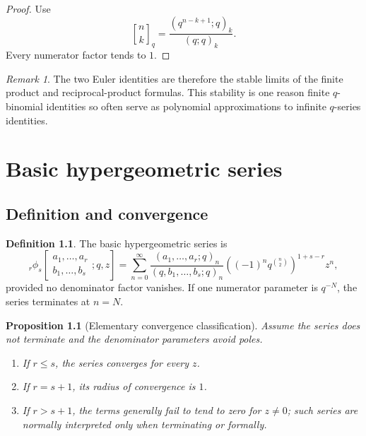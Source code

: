 \documentclass[11pt,oneside,openany]{book}
\newtheorem{proposition}[proposition]{Proposition}
\theoremstyle{definition}
\newtheorem{definition}[definition]{Definition}
\theoremstyle{remark}
\newtheorem{remark}[remark]{Remark}
\newcommand{\qbinom}[2]{\genfrac{[}{]}{0pt}{}{#1}{#2}_{q}}
\begin{document}
\begin{proof}
Use
\[
 \qbinom nk=\frac{(q^{n-k+1};q)_k}{(q;q)_k}.
\]
Every numerator factor tends to $1$.
\end{proof}

\begin{remark}
The two Euler identities are therefore the stable limits of the finite product and reciprocal-product formulas.  This stability is one reason finite $q$-binomial identities so often serve as polynomial approximations to infinite $q$-series identities.
\end{remark}

\chapter{Basic hypergeometric series}\label{chap:basic-hypergeometric}

\section{Definition and convergence}

\begin{definition}
The basic hypergeometric series is
\[
 {}_r\phi_s\!\left[
 \begin{matrix}a_1,\dots,a_r\\ b_1,\dots,b_s\end{matrix};q,z\right]
 =\sum_{n=0}^{\infty}
 \frac{(a_1,\dots,a_r;q)_n}{(q,b_1,\dots,b_s;q)_n}
 \left((-1)^nq^{\binom n2}\right)^{1+s-r}z^n,
\]
provided no denominator factor vanishes.  If one numerator parameter is $q^{-N}$, the series terminates at $n=N$.
\end{definition}

\begin{proposition}[Elementary convergence classification]\label{prop:phi-convergence}
Assume the series does not terminate and the denominator parameters avoid poles.
\begin{enumerate}[label=\textup{(\roman*)}]
\item If $r\le s$, the series converges for every $z$.
\item If $r=s+1$, its radius of convergence is $1$.
\item If $r>s+1$, the terms generally fail to tend to zero for $z\ne0$; such series are normally interpreted only when terminating or formally.
\end{enumerate}
\end{proposition}
\end{document}
